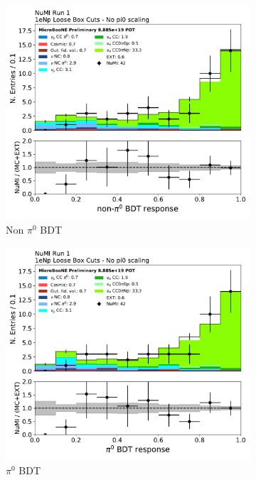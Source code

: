 \begin{figure}[H]
    \centering
    \begin{subfigure}{0.4\textwidth}
    \includegraphics[width=1.0\textwidth]{Sidebands/Figures/NuMI/1eNp/nonpi0_score.pdf}
    \caption{Non $\pi^0$ BDT}
    \end{subfigure}
    \begin{subfigure}{0.4\textwidth}
    \includegraphics[width=1.0\textwidth]{Sidebands/Figures/NuMI/1eNp/pi0_score.pdf}
    \caption{$\pi^0$ BDT}
    \end{subfigure}
    \caption{} 
    \label{fig:NuMI_1eNp_7}
\end{figure}


